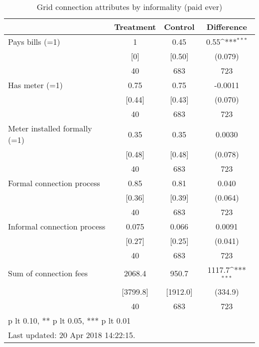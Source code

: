 \begin{table}[htbp]\centering
\def\sym#1{\ifmmode^{#1}\else\(^{#1}\)\fi}
\caption{Grid connection attributes by informality (paid ever) \label{tab:"balance"}}
\begin{tabular*}{0.9\hsize}{@{\hskip\tabcolsep\extracolsep\fill}l*{1}{ccc}}
\toprule
                                &Treatment&  Control&Difference         \\
\midrule
Pays bills (=1)                 &        1&     0.45&     0.55\sym{***}\\
                                &      [0]&   [0.50]&  (0.079)         \\
                                &       40&      683&      723         \\
Has meter (=1)                  &     0.75&     0.75&  -0.0011         \\
                                &   [0.44]&   [0.43]&  (0.070)         \\
                                &       40&      683&      723         \\
Meter installed formally (=1)   &     0.35&     0.35&   0.0030         \\
                                &   [0.48]&   [0.48]&  (0.078)         \\
                                &       40&      683&      723         \\
Formal connection process       &     0.85&     0.81&    0.040         \\
                                &   [0.36]&   [0.39]&  (0.064)         \\
                                &       40&      683&      723         \\
Informal connection process     &    0.075&    0.066&   0.0091         \\
                                &   [0.27]&   [0.25]&  (0.041)         \\
                                &       40&      683&      723         \\
Sum of connection fees          &   2068.4&    950.7&   1117.7\sym{***}\\
                                & [3799.8]& [1912.0]&  (334.9)         \\
                                &       40&      683&      723         \\
\bottomrule
\multicolumn{4}{l}{\footnotesize * p lt 0.10, ** p lt 0.05, *** p lt 0.01}\\
\multicolumn{4}{l}{\footnotesize Last updated: 20 Apr 2018 14:22:15.}\\
\end{tabular*}
\end{table}
